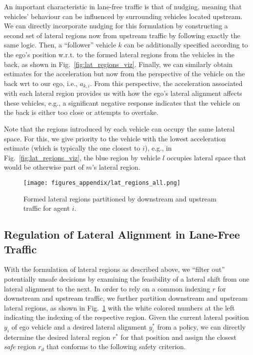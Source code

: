 An important characteristic in lane-free traffic is that of nudging, meaning that vehicles' behaviour can be influenced by surrounding vehicles located upstream.
We can directly incorporate nudging for this formulation by constructing a second set of lateral regions now from upstream traffic by following exactly the same logic. 
Then, a ``follower'' vehicle $k$ can be additionally specified according to the ego's position w.r.t. to the formed lateral regions from the vehicles in the back, as shown in Fig.~\ref{fig:lat_regions_viz}.
Finally, we can similarly obtain estimates for the acceleration but now from the perspective of the vehicle on the back wrt to our ego, i.e., $a_{k,i}$.
From this perspective, the acceleration associated with each lateral region provides us with how the ego's  lateral alignment affects these vehicles, e.g., a significant negative response indicates that the vehicle on the back is either too close or attempts to overtake.

Note that the regions introduced by each vehicle can occupy the same lateral space. 
For this, we give priority to the vehicle with the lowest acceleration estimate (which is typically the one closest to $i$), e.g., in Fig.~\ref{fig:lat_regions_viz}, the blue region by vehicle $l$ occupies lateral space that would be otherwise part of $m$'s lateral region.


\begin{figure}[b]
    \centering
    \texttt{[image: figures\_appendix/lat\_regions\_all.png]}
    \caption{Formed lateral regions partitioned by downstream and upstream traffic for agent $i$.}
    \label{fig:lat_regions_part}
\end{figure}

\subsection{Regulation of Lateral Alignment in Lane-Free Traffic}\label{subsec:reg_lat_align}


With the formulation of lateral regions as described above, we ``filter out'' potentially unsafe decisions by examining the feasibility of a lateral shift from one lateral alignment to the next. 
In order to rely on a common indexing $r$ for downstream and upstream traffic, we further partition downstream and upstream lateral regions, as shown in Fig.~\ref{fig:lat_regions_part} with the white colored numbers at the left indicating the indexing of the respective region.
Given the current lateral position $y_i$ of ego vehicle and a desired lateral alignment $y_i^*$ from a policy, we can directly determine the desired lateral region 
$r^*$ for that position and assign the closest {\em safe} region $r_d$ that conforms to the following safety criterion.

